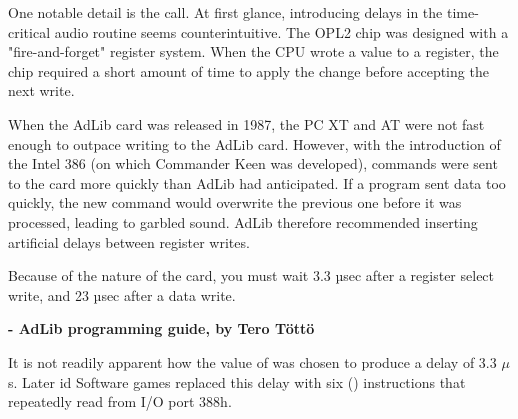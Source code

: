 \documentclass[book.tex]{subfiles}
\begin{document}
\par
\begin{minipage}{\textwidth}

\end{minipage}

\par
One notable detail is the  call. At first glance, introducing delays in the time-critical audio routine seems counterintuitive. The OPL2 chip was designed with a "fire-and-forget" register system. When the CPU wrote a value to a register, the chip required a short amount of time to apply the change before accepting the next write.\\

\par
When the AdLib card was released in 1987, the PC XT and AT were not fast enough to outpace writing to the AdLib card. However, with the introduction of the Intel 386 (on which Commander Keen was developed), commands were sent to the card more quickly than AdLib had anticipated. If a program sent data too quickly, the new command would overwrite the previous one before it was processed, leading to garbled sound. AdLib therefore recommended inserting artificial delays between register writes.\\

\begin{fancyquotes}
Because of the nature of the card, you must wait 3.3 µsec after a register select write, and 23 µsec after a data write.\\

\par
\textbf{- AdLib programming guide, by Tero Töttö}
\end{fancyquotes}

\par
It is not readily apparent how the value of  was chosen to produce a delay of 3.3 $\mu$s. Later id Software games replaced this delay with six () instructions that repeatedly read from I/O port 388h.
\end{document}
